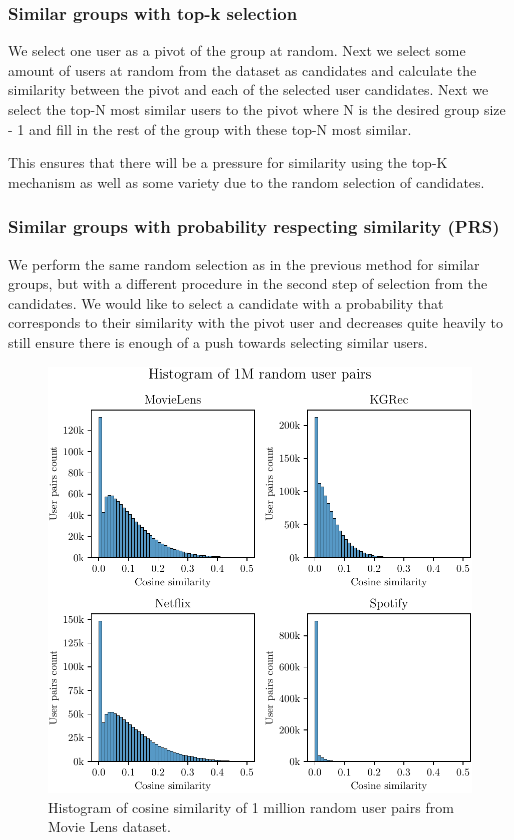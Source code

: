 \subsubsection{Similar groups with top-k selection}
We select one user as a pivot of the group at random. Next we select some amount of users at random from the dataset as candidates and calculate the similarity between the pivot and each of the selected user candidates. Next we select the top-N most similar users to the pivot where N is the desired group size - 1 and fill in the rest of the group with these top-N most similar.

This ensures that there will be a pressure for similarity using the top-K mechanism as well as some variety due to the random selection of candidates.

\subsubsection{Similar groups with probability respecting similarity (PRS)}
We perform the same random selection as in the previous method for similar groups, but with a different procedure in the second step of selection from the candidates. We would like to select a candidate with a probability that corresponds to their similarity with the pivot user and decreases quite heavily to still ensure there is enough of a push towards selecting similar users.

\begin{figure}[ht!]
    \centering
    \includegraphics{img/figures/histogram_cosine_all.pdf}
    \caption{Histogram of cosine similarity of 1 million random user pairs from Movie Lens dataset.}
    \label{fig:cosine_all_histogram}
\end{figure}

